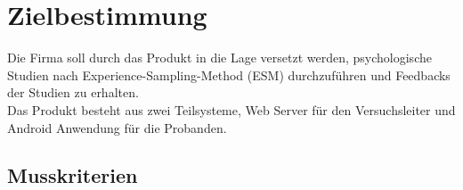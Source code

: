 \documentclass[a4paper]{scrreprt}
\begin{document}

 
    \chapter{Zielbestimmung}
        Die Firma soll durch das Produkt in die Lage versetzt werden, psychologische Studien nach Experience-Sampling-Method (ESM) durchzuf\"uhren und Feedbacks der Studien zu erhalten.\\

        \noindent Das Produkt besteht aus zwei Teilsysteme, Web Server f\"ur den Versuchsleiter und Android Anwendung f\"ur die Probanden.
 
 
        \section{Musskriterien}
            \vspace*{0.3cm}
\end{document}
